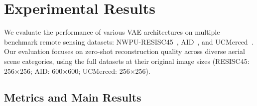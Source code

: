 \documentclass{article} %
\begin{document}
\begin{table}[h]
\centering
\tiny
{}
\caption{Zero-shot performance on the UCMerced dataset (2.1K images, 21 classes, 256$\times$256px), evaluated at original image size.}
\label{tab:ucmerced_results}
\end{table}

\section{Experimental Results}

We evaluate the performance of various VAE architectures on multiple benchmark remote sensing datasets: NWPU-RESISC45~\citep{chengRemoteSensingImage2017}, AID~\citep{xia2017aid}, and UCMerced~\citep{yangBagofVisualWords2010}. Our evaluation focuses on zero-shot reconstruction quality across diverse aerial scene categories, using the full datasets at their original image sizes (RESISC45: 256$\times$256; AID: 600$\times$600; UCMerced: 256$\times$256).

\subsection{Metrics and Main Results}
\end{document}
